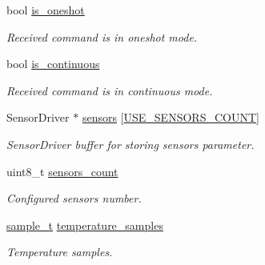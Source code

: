 \begin{DoxyCompactItemize}
\mbox{\label{i2c-th_8h_a6090a983e62d9556906716dd85f78d9d}} 
bool \hyperlink{i2c-th_8h_a6090a983e62d9556906716dd85f78d9d}{is\+\_\+oneshot}
\begin{DoxyCompactList}\small\item\em Received command is in oneshot mode. \end{DoxyCompactList}\item 
\mbox{\label{i2c-th_8h_a75ef189b6b17aa09010c574ed6b01fc3}} 
bool \hyperlink{i2c-th_8h_a75ef189b6b17aa09010c574ed6b01fc3}{is\+\_\+continuous}
\begin{DoxyCompactList}\small\item\em Received command is in continuous mode. \end{DoxyCompactList}\item 
\mbox{\label{i2c-th_8h_ac07b59f913caef2eaea4e4bb93c901e9}} 
Sensor\+Driver $\ast$ \hyperlink{i2c-th_8h_ac07b59f913caef2eaea4e4bb93c901e9}{sensors} \mbox{[}\hyperlink{i2c-th-config_8h_af18dc3de744722cb308451b7a705611b}{U\+S\+E\+\_\+\+S\+E\+N\+S\+O\+R\+S\+\_\+\+C\+O\+U\+NT}\mbox{]}
\begin{DoxyCompactList}\small\item\em Sensor\+Driver buffer for storing sensors parameter. \end{DoxyCompactList}\item 
\mbox{\label{i2c-th_8h_a7727577f63dfa4aa55feb7ddd0739f83}} 
uint8\+\_\+t \hyperlink{i2c-th_8h_a7727577f63dfa4aa55feb7ddd0739f83}{sensors\+\_\+count}
\begin{DoxyCompactList}\small\item\em Configured sensors number. \end{DoxyCompactList}\item 
\mbox{\label{i2c-th_8h_a3d666fceb96c16f06f662120dac2b616}} 
\hyperlink{structsample__t}{sample\+\_\+t} \hyperlink{i2c-th_8h_a3d666fceb96c16f06f662120dac2b616}{temperature\+\_\+samples}
\begin{DoxyCompactList}\small\item\em Temperature samples. \end{DoxyCompactList}\item 
\mbox{\label{i2c-th_8h_a3d73872b407d68a2858f5fd4104b8f46}} 

\end{DoxyCompactItemize}
